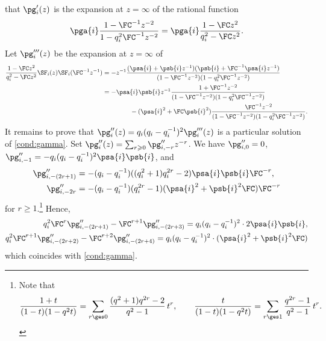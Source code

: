 \documentclass[reqno]{amsart}
\numberwithin{equation}{section}
\begin{document}
that $\pg'_{i}(z)$ is the expansion at $z=\infty$ of the rational function
	\begin{equation}
	\begin{aligned}
		\pga{i}\frac{1-\FC^{-1}z^{-2}}{1-q_i^2\FC^{-1}z^{-2}}
		=\pga{i}\frac{1-\FC z^{2}}{q_i^2-\FC z^{2}}.
	\end{aligned}
\end{equation}
Let $\pg_i'''(z)$ be the expansion at $z=\infty$ of
\begin{equation}
	\begin{aligned}
		\frac{1-\FC z^{2}}{q_i^2-\FC z^{2}}\SF_i(z)\SF_i(\FC^{-1}z^{-1})
		&=-z^{-1}
		\frac{(\psa{i}+\psb{i}z^{-1})(\psb{i}+\FC^{-1}\psa{i}z^{-1})}
		{(1-\FC^{-1}z^{-2})(1-q_i^2\FC^{-1}z^{-2})}\\
		&=-
		\psa{i}\psb{i}z^{-1}\frac{1+\FC^{-1}z^{-2}}{(1-\FC^{-1}z^{-2})(1-q_i^2\FC^{-1}z^{-2})}
		\\
		&\hspace{1.5cm}
		-
		(\psa{i}^2+\FC \psb{i}^2)\frac{\FC^{-1}z^{-2}}{(1-\FC^{-1}z^{-2})(1-q_i^2\FC^{-1}z^{-2})}.
	\end{aligned}
\end{equation}
It remains to prove that $\pg_i''(z)=q_i(q_i-q_i^{-1})^2\pg'''_i(z)$ is a particular solution of \eqref{cond:gamma}. Set $\pg_i''(z)=\sum_{r\geqslant 0}\pg''_{i,-r}z^{-r}$.
We have $\pg''_{i,0}=0$, $\pg''_{i,-1}=-q_i(q_i-q_i^{-1})^2\psa{i}\psb{i}$, and
\begin{equation}
\begin{aligned}
	\pg''_{i,-(2r+1)}&=-(q_i-q_i^{-1})((q_i^{2}+1)q_i^{2r}-2)\psa{i}\psb{i}\FC^{-r},\\
	\pg''_{i,-2r}&=-(q_i-q_i^{-1})(q_i^{2r}-1)(\psa{i}^2+\psb{i}^2\FC)\FC^{-r}
\end{aligned}
\end{equation}
for $r\geqslant 1$.\footnote{
Note that
\[
\frac{1+t}{(1-t)(1-q^2t)}
=
\sum_{r\ges 0}\frac{(q^2+1)q^{2r}-2}{q^2-1}\,t^r,
\qquad
\frac{t}{(1-t)(1-q^2t)}
=
\sum_{r\ges 1}\frac{q^{2r}-1}{q^2-1}\,t^r.
\]
}
Hence,
\begin{equation}
\begin{aligned}
q_i^2\FC^r\pg''_{i,-(2r+1)}-\FC^{r+1}\pg''_{i,-(2r+3)}=q_i(q_i-q_i^{-1})^2\cdot 2\psa{i}\psb{i},\\
q_i^2\FC^{r+1}\pg''_{i,-(2r+2)}-\FC^{r+2}\pg''_{i,-(2r+4)}=q_i(q_i-q_i^{-1})^2\cdot (\psa{i}^2+\psb{i}^2\FC)
\end{aligned}
\end{equation}
which coincides with \eqref{cond:gamma}.
\end{document}
